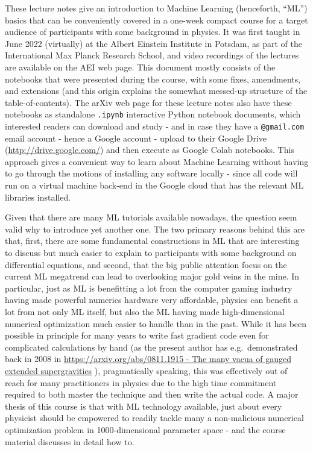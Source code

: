 \documentclass[11pt]{article}
\begin{document}
These lecture notes give an introduction to Machine Learning
(henceforth, ``ML'') basics that can be conveniently covered in a
one-week compact course for a target audience of participants with some
background in physics. It was first taught in June 2022 (virtually) at
the Albert Einstein Institute in Potsdam, as part of the International
Max Planck Research School, and video recordings of the lectures are
available on the AEI web page. This document mostly consists of the
notebooks that were presented during the course, with some fixes,
amendments, and extensions (and this origin explains the somewhat
messed-up structure of the table-of-contents). The arXiv web page for
these lecture notes also have these notebooks as standalone
\texttt{.ipynb} interactive Python notebook documents, which interested
readers can download and study - and in case they have a
\texttt{@gmail.com} email account - hence a Google account - upload to
their Google Drive (\url{http://drive.google.com/}) and then execute as
Google Colab notebooks. This approach gives a convenient way to learn
about Machine Learning without having to go through the motions of
installing any software locally - since all code will run on a virtual
machine back-end in the Google cloud that has the relevant ML libraries
installed.

Given that there are many ML tutorials available nowadays, the question
seem valid why to introduce yet another one. The two primary reasons
behind this are that, first, there are some fundamental constructions in
ML that are interesting to discuss but much easier to explain to
participants with some background on differential equations, and second,
that the big public attention focus on the current ML megatrend can lead
to overlooking major gold veins in the mine. In particular, just as ML
is benefitting a lot from the computer gaming industry having made
powerful numerics hardware very affordable, physics can benefit a lot
from not only ML itself, but also the ML having made high-dimensional
numerical optimization much easier to handle than in the past. While it
has been possible in principle for many years to write fast gradient
code even for complicated calculations by hand (as the present author
has e.g.~demonstrated back in 2008 in
\href{https://arxiv.org/abs/0811.1915}{https://arxiv.org/abs/0811.1915 -
The many vacua of gauged extended supergravities} \cite{fischbacher2009many}), pragmatically
speaking, this was effectively out of reach for many practitioners in
physics due to the high time commitment required to both master the
technique and then write the actual code. A major thesis of this course
is that with ML technology available, just about every physicist should
be empowered to readily tackle many a non-malicious numerical
optimization problem in 1000-dimensional parameter space - and the
course material discusses in detail how to.
\end{document}
